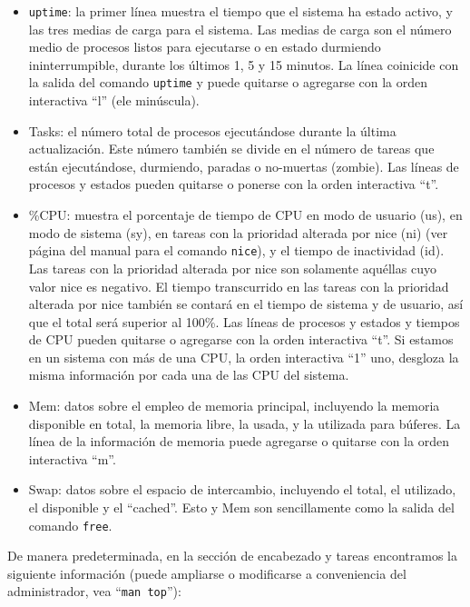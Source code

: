 \documentclass[12pt]{article}
\begin{document}
\begin{itemize}
\item \texttt{uptime}: la primer línea muestra el tiempo
 que el sistema ha  estado  activo,  y  las  tres medias de carga para el 
sistema. Las medias de carga son  el número medio de procesos listos  para
ejecutarse  o en estado durmiendo ininterrumpible, durante  los  últimos
1,  5  y  15  minutos.  La línea coinicide con la salida del comando 
\texttt{uptime} y puede quitarse o agregarse con la orden interactiva 
``l'' (ele minúscula).
\item  Tasks: el  número  total  de  procesos ejecutándose durante  la  
última actualización. Este número también  se  divide  en  el  número 
de  tareas  que  están  ejecutándose, durmiendo, paradas o no-muertas 
(zombie).  Las líneas de procesos y estados pueden quitarse o ponerse con 
la orden interactiva ``t''.
\item  \%CPU: muestra el porcentaje de tiempo de CPU en modo de usuario 
(us), en modo  de sistema (sy), en tareas con la prioridad alterada por
 nice (ni) (ver página del manual para el comando \texttt{nice}), y el 
 tiempo  de  inactividad (id).  Las tareas con la prioridad alterada por 
nice son solamente aquéllas cuyo  valor  nice  es  negativo. El tiempo  
transcurrido  en  las tareas con la prioridad alterada por nice también 
se contará en el tiempo de sistema y de usuario,  así que  el  total  
será  superior  al  100\%. Las líneas de procesos y estados y tiempos
 de CPU pueden quitarse o agregarse  con  la  orden interactiva ``t''.
Si estamos en un sistema con más de una CPU, la orden interactiva ``1'' 
uno, desgloza la misma información por cada una de las CPU del sistema.
\item Mem: datos sobre el empleo de memoria principal, incluyendo la 
memoria disponible en total,  la  memoria  libre,  la  usada, y  la
utilizada  para  búferes.  La  línea  de la información de memoria puede 
agregarse o quitarse con la orden interactiva ``m''.
\item Swap: datos sobre el  espacio  de  intercambio,  incluyendo  el  
total,  el utilizado, el disponible  y  el ``cached''. Esto y Mem son 
sencillamente como la salida del comando \texttt{free}.
\end{itemize}

De manera predeterminada, en la sección de encabezado y tareas encontramos
la siguiente información (puede ampliarse o modificarse a conveniencia del
administrador, vea ``\texttt{man top}''):
\end{document}

